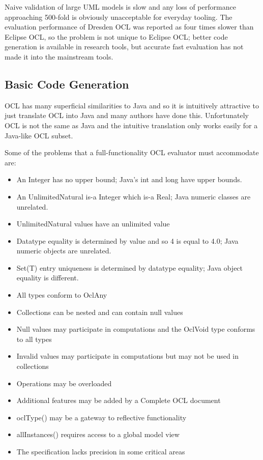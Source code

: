 \documentclass{acm_proc_article-sp}
\begin{document}
Naive validation of large UML models is slow and any loss of performance approaching 500-fold is
obviously unacceptable for everyday tooling. The evaluation performance of Dresden OCL was reported as four times slower than Eclipse OCL, so the problem is not unique to Eclipse OCL; better code generation  is available in research tools, but
accurate fast evaluation has not made it into the mainstream tools.

\subsection{Basic Code Generation}

OCL has many superficial similarities to Java and so it is intuitively attractive to just translate OCL into Java and many authors have done this. Unfortunately OCL is not the same as Java and the intuitive translation only works easily for a Java-like OCL subset.

Some of the problems that a full-functionality OCL evaluator must accommodate are:
\begin{itemize}
\item An Integer has no upper bound; Java's int and long have upper bounds.
\item An UnlimitedNatural is-a Integer which is-a Real; Java numeric classes are unrelated.
\item UnlimitedNatural values have an unlimited value
\item Datatype equality is determined by value and so 4 is equal to 4.0; Java numeric objects are unrelated.
\item Set(T) entry uniqueness is determined by datatype equality; Java object equality is different.
\item All types conform to OclAny
\item Collections can be nested and can contain null values
\item Null values may participate in computations and the OclVoid type conforms to all types
\item Invalid values may participate in computations but may not be used in collections
\item Operations may be overloaded
\item Additional features may be added by a Complete OCL document
\item oclType() may be a gateway to reflective functionality
\item allInstances() requires access to a global model view 
\item The specification lacks precision in some critical areas
\end{itemize}
\end{document}
